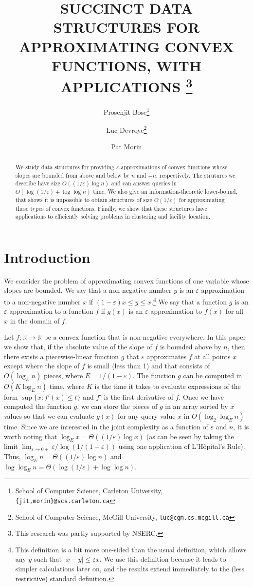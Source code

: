 \documentclass[charterfonts,lotsofwhite]{patmorin}
\title{\MakeUppercase{Succinct Data Structures for Approximating
Convex Functions, with Applications}%
     \thanks{This research was partly supported by NSERC.}}
\author{Prosenjit Bose\thanks{School of Computer Science, Carleton
	University, \texttt{\{jit,morin\}@scs.carleton.ca}} \and
  Luc Devroye\thanks{School of Computer Science, McGill University,
  	\texttt{luc@cgm.cs.mcgill.ca}} \and 
  Pat Morin\footnotemark[3]}
\date{}
\newcommand{\eps}{\varepsilon}
\newcommand{\Real}{\mathbb{R}}
\begin{document}
\maketitle

\begin{abstract} 
We study data structures for providing $\eps$-approximations of convex
functions whose slopes are bounded from above and below by $n$ and
$-n$, respectively. The strutures we describe have size
$O((1/\eps)\log n)$ and can answer queries in $O(\log(1/\eps)+\log\log
n)$ time.  We also give an information-theoretic lower-bound, that
shows it is impossible to obtain structures of size $O(1/\eps)$ for
approximating these types of convex functions.  Finally, we show that
these structures have applications to efficiently solving problems in
clustering and facility location.  
\end{abstract}

\section{Introduction}

We consider the problem of approximating convex functions of one
variable whose slopes are bounded.  We say that a non-negative number
$y$ is an $\eps$-approximation to a non-negative number $x$ if
$(1-\eps)x\le y \le x$.\footnote{This definition is a bit more
one-sided than the usual definition, which allows any $y$ such that
$|x-y|\le \eps x$.  We use this definition because it leads to simpler
calculations later on, and the results extend immediately to the (less
restrictive) standard definition.}  We say that a function $g$ is an
$\eps$-approximation to a function $f$ if $g(x)$ is an
$\eps$-approximation to $f(x)$ for all $x$ in the domain of $f$.

Let $f:\Real\rightarrow \Real$ be a convex function that is
non-negative everywhere.  In this paper we show that, if the absolute
value of the slope of $f$ is bounded above by $n$, then there exists a
piecewise-linear function $g$ that $\eps$ approximates $f$ at all
points $x$ except where the slope of $f$ is small (less than 1) and
that consists of $O(\log_E n)$ pieces, where $E=1/(1-\eps)$.  The
function $g$ can be computed in $O(K\log_E n)$ time, where $K$ is the
time it takes to evaluate expressions of the form $\sup\{x: f'(x)\le
t\}$ and $f'$ is the first derivative of $f$.  Once we have computed
the function $g$, we can store the pieces of $g$ in an array sorted by
$x$ values so that we can evaluate $g(x)$ for any query value $x$ in
$O(\log_2\log_E n)$ time.  Since we are interested in the joint
complexity as a function of $\eps$ and $n$, it is worth
noting that $\log_E x = \Theta ( (1/\eps) \log x)$ (as can be seen by
taking the limit $\lim_{\eps\rightarrow 0+}\eps/\log(1/(1-\eps))$
using one application of L'H\^opital's Rule). Thus, $\log_E
n=\Theta((1/\eps)\log n)$ and $\log\log_E n = \Theta (\log (1/\eps) +
\log \log n)$.
\end{document}
